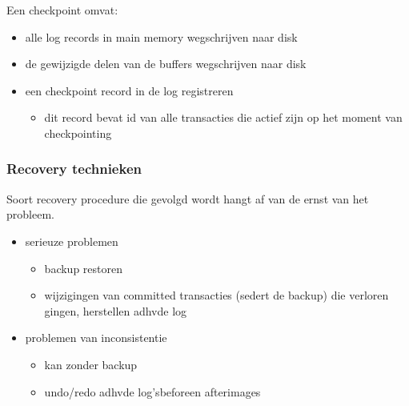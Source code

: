 \documentclass[a4paper,12pt]{article}
\begin{document}
Een checkpoint omvat:
\begin{itemize}
\item alle log records in main memory wegschrijven naar disk
\item de gewijzigde delen van de buffers wegschrijven naar disk
\item een checkpoint record in de log registreren
	\begin{itemize}
	\item dit record bevat id van alle transacties die actief zijn op het moment van checkpointing
	\end{itemize}
\end{itemize}

\subsubsection{Recovery technieken}
Soort recovery procedure die gevolgd wordt hangt af van de ernst van het probleem.
\begin{itemize}
\item serieuze problemen
	\begin{itemize}
	\item backup restoren
	\item wijzigingen van committed transacties (sedert de backup) die verloren gingen, herstellen adhvde log
	\end{itemize}
\item problemen van inconsistentie
	\begin{itemize}
	\item kan zonder backup
	\item undo/redo adhvde log'sbeforeen afterimages
	\end{itemize}
\end{itemize}
\end{document}
